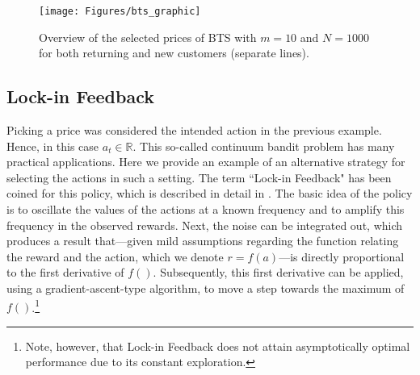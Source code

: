\documentclass[nojss]{jss}
\begin{document}
\begin{figure}[h!]
  \centering
    \texttt{[image: Figures/bts\_graphic]}
      \caption{Overview of the selected prices of BTS with $m = 10$ and $N = 1000$ for both returning and new customers (separate lines).}
      \label{fig:bts}
\end{figure}

\subsection{Lock-in Feedback}
\label{sec:lif}

Picking a price was considered the intended action in the previous example. Hence, in this case $a_t \in \mathbb{R}$. This so-called continuum bandit problem \citep{Bubeck2011b} has many practical applications. Here we provide an example of an alternative strategy for selecting the actions in such a setting. The term ``Lock-in Feedback" has been coined for this policy, which is described in detail in \citet{Kaptein2014d}. The basic idea of the policy is to oscillate the values of the actions at a known frequency and to amplify this frequency in the observed rewards. Next, the noise can be integrated out, which produces a result that---given mild assumptions regarding the function relating the reward and the action, which we denote $r = f(a)$---is directly proportional to the first derivative of $f()$. Subsequently, this first derivative can be applied, using a gradient-ascent-type algorithm, to move a step towards the maximum of $f()$.\footnote{Note, however, that Lock-in Feedback  does not attain asymptotically optimal performance due to its constant exploration.}
\end{document}
